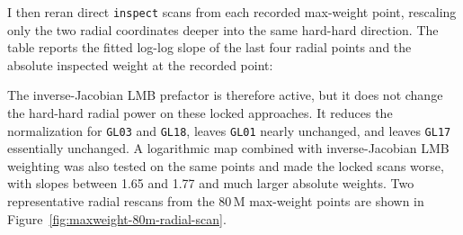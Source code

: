 \documentclass[11pt]{article}
\begin{document}
I then reran direct \texttt{inspect} scans from each recorded max-weight point,
rescaling only the two radial coordinates deeper into the same hard-hard
direction.  The table reports the fitted log-log slope of the last four
radial points and the absolute inspected weight at the recorded point:
\begin{center}
\scriptsize
{}
\end{center}
The inverse-Jacobian LMB prefactor is therefore active, but it does not change
the hard-hard radial power on these locked approaches.  It reduces the
normalization for \texttt{GL03} and \texttt{GL18}, leaves \texttt{GL01} nearly
unchanged, and leaves \texttt{GL17} essentially unchanged.  A logarithmic map
combined with inverse-Jacobian LMB weighting was also tested on the same
points and made the locked scans worse, with slopes between 1.65 and 1.77 and
much larger absolute weights.
Two representative radial rescans from the \(80\,\mathrm{M}\) max-weight
points are shown in Figure~\ref{fig:maxweight-80m-radial-scan}.
\end{document}
